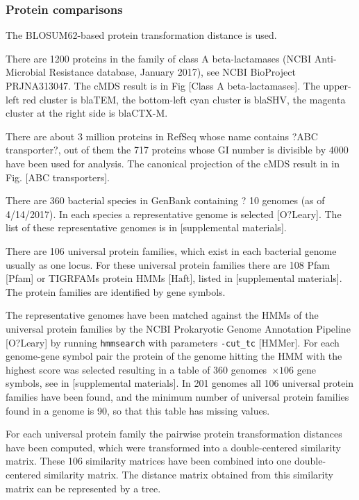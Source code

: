 \documentclass[10pt,a4paper]{article}
\begin{document}
\subsubsection{Protein comparisons}

The BLOSUM62-based protein transformation distance is used.



There are 1200 proteins in the family of class A beta-lactamases (NCBI Anti-Microbial Resistance database, January 2017),
see NCBI BioProject PRJNA313047.
The cMDS result is in Fig [Class A beta-lactamases].
The upper-left red cluster is blaTEM, the bottom-left cyan cluster is blaSHV, the magenta cluster at the right side is blaCTX-M.



There are about 3 million proteins in RefSeq whose name contains ?ABC transporter?,
out of them the 717 proteins whose GI number is divisible by 4000 have been used for analysis.
The canonical projection of the cMDS result in in Fig. [ABC transporters].



There are 360 bacterial species in GenBank containing ? 10 genomes (as of 4/14/2017).
In each species a representative genome is selected [O?Leary].
The list of these representative genomes is in [supplemental materials].

There are 106 universal protein families, which exist in each bacterial genome usually as one locus.
For these universal protein families there are 108 Pfam [Pfam] or TIGRFAMs protein HMMs [Haft], listed in [supplemental materials].
The protein families are identified by gene symbols.

The representative genomes have been matched against the HMMs of the universal protein families by the NCBI Prokaryotic Genome Annotation Pipeline [O?Leary] by running \verb|hmmsearch| with parameters \verb|-cut_tc| [HMMer].
For each genome-gene symbol pair the protein of the genome hitting the HMM with the highest score was selected resulting in a table of 360 genomes~$\times 106$ gene symbols, see in [supplemental materials].
In 201 genomes all 106 universal protein families have been found,
and the minimum number of universal protein families found in a genome is 90, so that this table has missing values.

For each universal protein family the pairwise protein transformation distances have been computed,
which were transformed into a double-centered similarity matrix.
These 106 similarity matrices have been combined into one double-centered similarity matrix.
The distance matrix obtained from this similarity matrix can be represented by a tree.
\end{document}
